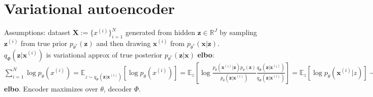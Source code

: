 \section{Variational autoencoder}
Assumptions: dataset $\mathbf{X}:= \{x^{(i)}\}_{i=1}^N$ generated from hidden $\mathbf{z} \in \mathbb{R}^J$ by sampling $\mathbf{z}^{(i)}$ from true prior $p_{\theta^*}(\mathbf{z})$ and then drawing $\mathbf{x}^{(i)}$ from $p_{\theta^*}(\mathbf{x} | \mathbf{z})$. $q_\Phi(\mathbf{z}|\mathbf{x}^{(i)})$ is variational approx of true posterior $p_{\theta^*}(\mathbf{z} | \mathbf{x})$ \textbf{elbo}: $\sum_{i=1}^N\log{p_\theta(x^{(i)})}=\mathbb{E}_{z \sim q_\Phi(\mathbf{z}|\mathbf{x}^{(i)})}[\log{p_\theta(x^{(i)})}] = \mathbb{E}_z[\log{\frac{p_{\theta}(\mathbf{x}^{(i)} | \mathbf{z})p_{\theta}(\mathbf{z})}{p_{\theta}(\mathbf{z} | \mathbf{x}^{(i)})}\frac{q_\Phi(\mathbf{z}|\mathbf{x}^{(i)})}{q_\Phi(\mathbf{z}|\mathbf{x}^{(i)})}}] = \mathbb{E}_z[\log{p_{\theta}(\mathbf{x}^{(i)}|z)}] - \mathbb{E}_z[\log{\frac{q_\Phi(\mathbf{z}|\mathbf{x}^{(i)})}{p_{\theta}(\mathbf{z})}}] + \mathbb{E}_z[\log{\frac{q_\Phi(\mathbf{z}|\mathbf{x}^{(i)})}{p_{\theta}(\mathbf{z}|\mathbf{x}^{(i)})}}] = \mathbb{E}_z[\log{p_{\theta}(\mathbf{x}^{(i)}|z)}] - D_{KL}({q_\Phi(\mathbf{z}|\mathbf{x}^{(i)})}||{p_{\theta}(\mathbf{z})}) + D_{KL}({q_\Phi(\mathbf{z}|\mathbf{x}^{(i)})}||{p_{\theta}(\mathbf{z}|\mathbf{x}^{(i)})}) \geq \mathbb{E}_z[\log{p_{\theta}(\mathbf{x}^{(i)}|z)}] - D_{KL}({q_\Phi(\mathbf{z}|\mathbf{x}^{(i)})}||{p_{\theta}(\mathbf{z})}) = $ \textbf{elbo}. Encoder maximizes over $\theta$, decoder $\Phi$.

